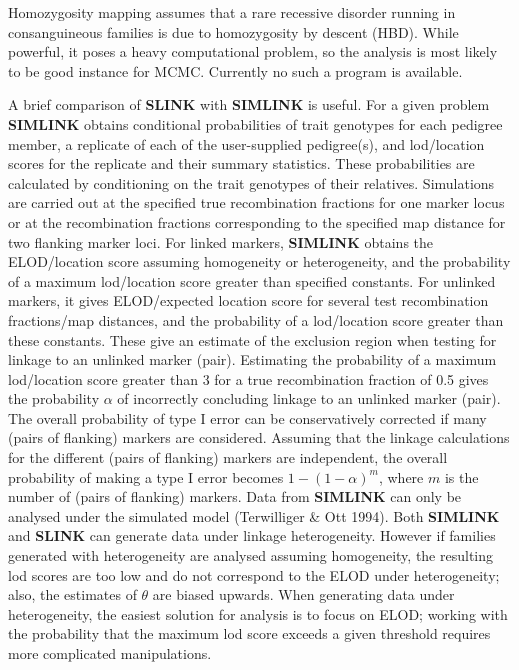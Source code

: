 Homozygosity mapping assumes that a rare recessive disorder running in
consanguineous families is due to homozygosity by descent (HBD).  While
powerful, it poses a heavy computational problem, so the analysis is most
likely to be good instance for MCMC.  Currently no such a program is available.

A brief comparison of {\bf SLINK} with {\bf SIMLINK} is useful.  For a given
problem {\bf SIMLINK} obtains conditional probabilities of trait genotypes for
each pedigree member, a replicate of each of the user-supplied pedigree(s), and
lod/location scores for the replicate and their summary statistics.  These
probabilities are calculated by conditioning on the trait genotypes of their
relatives.  Simulations are carried out at the specified true recombination
fractions for one marker locus or at the recombination fractions corresponding
to the specified map distance for two flanking marker loci.  For linked
markers, {\bf SIMLINK} obtains the ELOD/location score assuming homogeneity or
heterogeneity, and the probability of a maximum lod/location score greater than
specified constants.  For unlinked markers, it gives ELOD/expected location
score for several test recombination fractions/map distances, and the
probability of a lod/location score greater than these constants.  These give
an estimate of the exclusion region when testing for linkage to an unlinked
marker (pair).  Estimating the probability of a maximum lod/location score
greater than 3 for a true recombination fraction of 0.5 gives the probability
$\alpha$ of incorrectly concluding linkage to an unlinked marker (pair).  The
overall probability of type I error can be conservatively corrected if many
(pairs of flanking) markers are considered.  Assuming that the linkage
calculations for the different (pairs of flanking) markers are independent, the
overall probability of making a type I error becomes $1 - (1 - \alpha)^m$,
where $m$ is the number of (pairs of flanking) markers.  Data from {\bf
SIMLINK} can only be analysed under the simulated model (Terwilliger \& Ott
1994).  Both {\bf SIMLINK} and {\bf SLINK} can generate data under linkage
heterogeneity.  However if families generated with heterogeneity are analysed
assuming homogeneity, the resulting lod scores are too low and do not
correspond to the ELOD under heterogeneity; also, the estimates of $\theta$ are
biased upwards.  When generating data under heterogeneity, the easiest solution
for analysis is to focus on ELOD; working with the probability that the maximum
lod score exceeds a given threshold requires more complicated manipulations.
